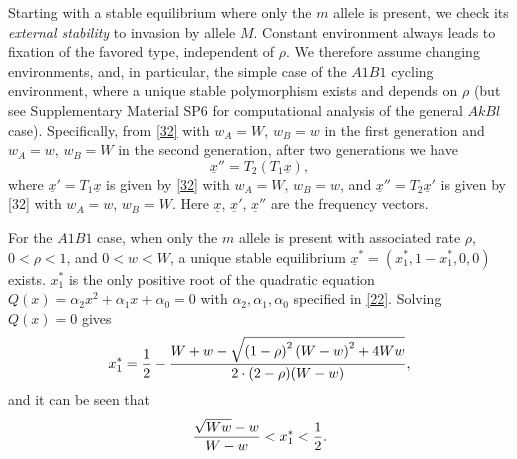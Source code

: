 \documentclass[9pt,twocolumn,twoside,lineno]{pnas-new}
\begin{document}
Starting with a stable equilibrium where only the $m$ allele is present, we check its {\sl external stability} \cite{feldman1986evolutionary,altenberg2017unified} to invasion by allele $M$.
Constant environment always leads to fixation of the favored type, independent of $\rho$. We therefore assume changing environments, and, in particular, the simple case of the $A1B1$ cycling environment, where a unique stable polymorphism exists and depends on $\rho$ (but see Supplementary Material SP6 for computational analysis of the general $AkBl$ case). Specifically, from \eqref{32} with $w_A =W$, $w_B =w$ in the first generation and $w_A=w$, $w_B=W$ in the second generation, after two generations we have
\begin{equation}
\underline x''=T_2(T_1\underline x),
\label{34}\end{equation}
where $\underline x'=T_1\underline x$ is given by \eqref{32} with $w_A=W$, $w_B=w$, and $\underline x''=T_2\underline x'$ is given by [32] with $w_A=w$, $w_B=W$. Here $\underline x$, $\underline x'$, $\underline x''$ are the frequency vectors.

For the $A1B1$ case, when only the $m$ allele is present with associated rate $\rho$,  $0<\rho<1$, and $0<w<W$, a unique stable equilibrium $\underline x^* =(x_1^*,1-x_1^*,0,0)$ exists. $x_1^*$ is the only positive root of the quadratic equation $Q(x) =\alpha_2x^2 +\alpha_1x +\alpha_0=0$ with $\alpha_2,\alpha_1,\alpha_0$ specified in \eqref{22}. Solving $Q(x)=0$ gives
\begin{equation}
x_1^* ={1\over 2} -{W+w-\sqrt{\left(1-\rho\right)^2\left(W-w\right)^2 +4Ww}\over 2\cdot(2-\rho)(W-w)},
\label{35}\end{equation}
 and it can be seen that
 \begin{equation}
 {\sqrt{Ww}-w\over W-w}<x_1^* <{1\over 2}.
 \label{36}\end{equation}
 
\end{document}
